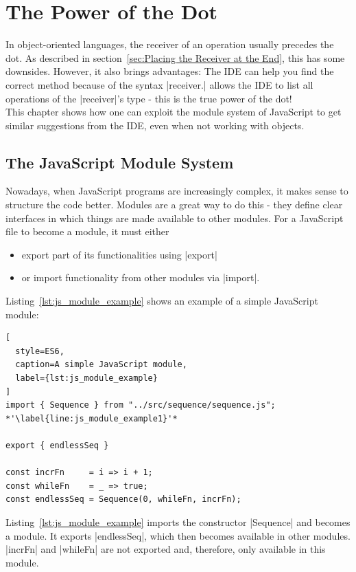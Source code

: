\chapter{The Power of the Dot} %
\label{chap:The Power of the Dot}
In object-oriented languages, the receiver of an operation usually precedes the
dot. As described in section~\ref{sec:Placing the Receiver at the End}, this
has some downsides. However, it also brings advantages: The IDE can help you
find the correct method because of the syntax |receiver.| allows the IDE to list
all operations of the |receiver|'s type - this is the true power of the dot!
\cite[Ch. "The Power of the Dot"]{frege_goodness} \\ This chapter shows how
one can exploit the module system of JavaScript to get similar suggestions from
the IDE, even when not working with objects.

\section{The JavaScript Module System} %
\label{sec:The JavaScript Module System}

Nowadays, when JavaScript programs are increasingly complex, it makes sense to
structure the code better. Modules are a great way to do this - they define
clear interfaces in which things are made available to other modules.
For a JavaScript file to become a module, it must either
\begin{itemize}
  \item export part of its functionalities using |export|
  \item or import functionality from other modules via |import|.
\end{itemize}

Listing~\ref{lst:js_module_example} shows an example of a simple JavaScript
module:
\begin{lstlisting}[
  style=ES6,
  caption=A simple JavaScript module,
  label={lst:js_module_example}
]
import { Sequence } from "../src/sequence/sequence.js"; *'\label{line:js_module_example1}'*

export { endlessSeq }

const incrFn     = i => i + 1;
const whileFn    = _ => true;
const endlessSeq = Sequence(0, whileFn, incrFn);
\end{lstlisting}

Listing~\ref{lst:js_module_example} imports the constructor |Sequence| and
becomes a module. It exports |endlessSeq|, which then becomes available in
other modules. |incrFn| and |whileFn| are not exported and, therefore, only
available in this module.

